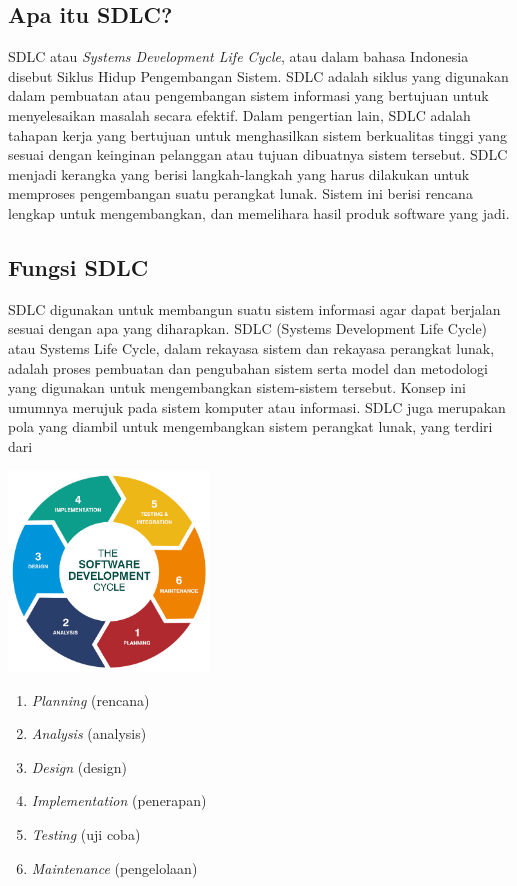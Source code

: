 \subsection{Apa itu SDLC?}
SDLC atau \emph{Systems Development Life Cycle}, atau  
dalam bahasa Indonesia disebut Siklus Hidup Pengembangan Sistem. SDLC adalah siklus yang 
digunakan dalam pembuatan atau pengembangan sistem informasi yang bertujuan untuk menyelesaikan
masalah secara efektif. Dalam pengertian lain, SDLC adalah tahapan kerja yang bertujuan untuk 
menghasilkan sistem berkualitas tinggi yang sesuai dengan keinginan pelanggan atau tujuan dibuatnya
sistem tersebut. SDLC menjadi kerangka yang berisi langkah-langkah yang harus dilakukan untuk 
memproses pengembangan suatu perangkat lunak. Sistem ini berisi rencana lengkap untuk mengembangkan, 
dan memelihara hasil produk software yang jadi.\cite{binus}

\subsection{Fungsi SDLC}
SDLC digunakan untuk membangun suatu sistem informasi agar dapat berjalan sesuai 
dengan apa yang diharapkan. SDLC (Systems Development Life Cycle) 
atau Systems Life Cycle, dalam rekayasa sistem dan rekayasa perangkat lunak, 
adalah proses pembuatan dan pengubahan sistem serta model dan metodologi yang digunakan untuk 
mengembangkan sistem-sistem tersebut. Konsep ini umumnya merujuk pada sistem komputer atau informasi. 
SDLC juga merupakan pola yang diambil untuk mengembangkan sistem perangkat lunak, yang terdiri dari 

\includegraphics[width=0.4\textwidth]{images/sdlc-cycle.jpg}

\begin{enumerate}
    \item \emph{Planning} (rencana)
    \item \emph{Analysis} (analysis)
    \item \emph{Design} (design)
    \item \emph{Implementation} (penerapan)
    \item \emph{Testing} (uji coba)
    \item \emph{Maintenance} (pengelolaan)
\end{enumerate}

